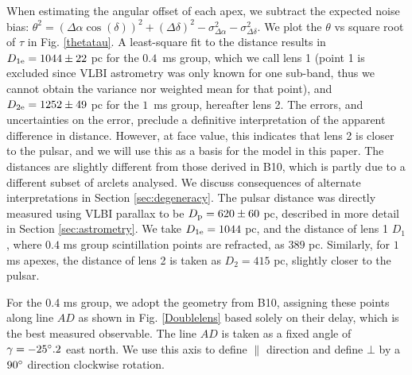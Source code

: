 \documentclass[useAMS,usenatbib]{mn2e}
\begin{document}
When estimating the angular offset of each apex,
we subtract the expected noise bias:
${\theta}^2=({\Delta\alpha}\cos(\delta))^2+({\Delta\delta})^2-\sigma^2_{\Delta\alpha}-\sigma^2_{\Delta\delta}$. 
We plot the $\theta$ vs square root of $\tau$ in Fig.
\ref{thetatau}.  A least-square fit to the distance results in
$D_{1{\rm e}}=1044\pm 22$ pc for the  $0.4$\ ms group, which we call
lens 1 (point 1 is excluded since VLBI astrometry was only known for
one sub-band, thus we cannot obtain the variance nor weighted mean for that point), and
$D_{2{\rm e}} = 1252 \pm 49$ pc for the $1$\ ms group, hereafter lens 2.
The errors, and uncertainties on the error, preclude a definitive
interpretation of the apparent difference in distance.  However, at face value, 
this indicates that lens 2 is closer to the pulsar, and we will
use this as a basis for the model in this paper.  
The distances are slightly different from those derived in
B10, which is partly due to a different subset
of arclets analysed.  We discuss
consequences of alternate interpretations in Section \ref{sec:degeneracy}.
The pulsar distance was directly measured using VLBI parallax to be
$D_{\rm p} = 620 \pm 60$ pc, described in more detail in Section \ref{sec:astrometry}.  
We take $D_{1{\rm e}}=1044$ pc,  and the distance of lens 1 $D_{1}$,
where $0.4$ ms group scintillation points are refracted, as $389$
pc. Similarly, for $1$ ms apexes, the distance of lens 2 is taken as $D_2=415$ pc,
slightly closer to the pulsar.


For the 0.4 ms group, we adopt the geometry from
B10, assigning these points along line $AD$ as
shown in Fig. \ref{Doublelens} based solely on their delay, which is
the best measured observable.  The line $AD$ is taken as a
fixed angle of $\gamma=-25\degree.2$ east north.  We use this axis
to define ${\parallel}$ direction and define ${\bot}$ by a $90\degree$ direction clockwise
rotation.  
\end{document}
